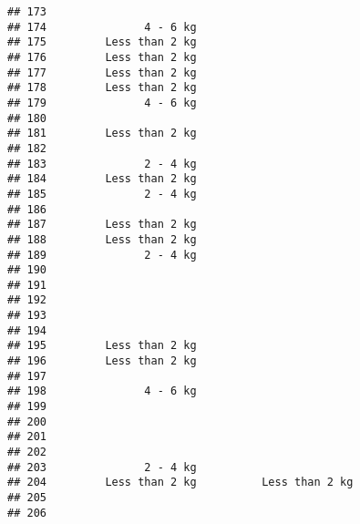 \documentclass[
]{article}
\begin{document}
\begin{verbatim}
## 173                                                                      
## 174               4 - 6 kg                                               
## 175         Less than 2 kg                                               
## 176         Less than 2 kg                                               
## 177         Less than 2 kg                                               
## 178         Less than 2 kg                                               
## 179               4 - 6 kg                                               
## 180                                                                      
## 181         Less than 2 kg                                               
## 182                                                                      
## 183               2 - 4 kg                                               
## 184         Less than 2 kg                                               
## 185               2 - 4 kg                                               
## 186                                                                      
## 187         Less than 2 kg                                               
## 188         Less than 2 kg                                               
## 189               2 - 4 kg                                               
## 190                                                                      
## 191                                                                      
## 192                                                                      
## 193                                                                      
## 194                                                                      
## 195         Less than 2 kg                                               
## 196         Less than 2 kg                                               
## 197                                                                      
## 198               4 - 6 kg                                               
## 199                                                                      
## 200                                                                      
## 201                                                                      
## 202                                                                      
## 203               2 - 4 kg                                               
## 204         Less than 2 kg          Less than 2 kg                       
## 205                                                                      
## 206                                                                      

\end{verbatim}
\end{document}
